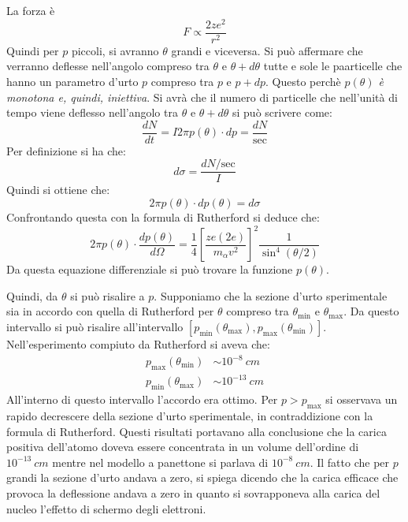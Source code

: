 La forza è
\begin{equation}
F \propto \dfrac{2ze^{2}}{r^{2}}
\end{equation}
Quindi per $p$ piccoli, si avranno $\theta$ grandi e viceversa. Si può affermare
che verranno deflesse nell'angolo compreso tra $\theta$ e $\theta +d\theta$
tutte e sole le paarticelle che hanno un parametro d'urto $p$ compreso tra $p$ e
$p + dp$. Questo perchè \textit{$p(\theta)$ è monotona e, quindi, iniettiva}. Si
avrà che il numero di particelle che nell'unità di tempo viene deflesso
nell'angolo tra $\theta$ e $\theta + d\theta$ si può scrivere come:
\begin{equation}
  \frac{dN}{dt} = I2\pi p(\theta) \cdot dp = \dfrac{dN}{\text{sec}}
\end{equation}
Per definizione si ha che:
\begin{equation}
  d\sigma = \dfrac{dN/\text{sec}}{I}
\end{equation}
Quindi si ottiene che:
\begin{equation}
2\pi p(\theta) \cdot dp(\theta) = d\sigma
\end{equation}
Confrontando questa con la formula di Rutherford si deduce che:
\begin{equation}
2\pi p(\theta) \cdot \dfrac{dp(\theta)}{d\Omega} = \dfrac{1}{4}\left[\dfrac{ze(2e)}{m_{\alpha}v^{2}} \right] ^{2} \dfrac{1}{\sin ^{4} (\theta /2)}
\end{equation}
Da questa equazione differenziale si può trovare la funzione $p(\theta)$.

Quindi, da $\theta$ si può risalire a $p$. Supponiamo che la sezione d'urto
sperimentale sia in accordo con quella di Rutherford per $\theta$ compreso tra
$\theta _\text{min}$ e $\theta _\text{max}$. Da questo intervallo si può
risalire all'intervallo $\left[p_\text{min} (\theta _\text{max}), p_\text{max}
(\theta _\text{min}) \right]$. Nell'esperimento compiuto da Rutherford si aveva
che:
\begin{align}
p_\text{max} (\theta _\text{min}) & \sim 10^{-8} \ cm \\
p_\text{min} (\theta _\text{max}) & \sim 10^{-13} \ cm 
\end{align}
All'interno di questo intervallo l'accordo era ottimo. Per $p > p_\text{max}$ si
osservava un rapido decrescere della sezione d'urto sperimentale, in
contraddizione con la formula di Rutherford. Questi risultati portavano alla
conclusione che la carica positiva dell'atomo doveva essere concentrata in un
volume dell'ordine di $10^{-13}\ cm$ mentre nel modello a panettone si parlava
di $10^{-8} \ cm$. Il fatto che per $p$ grandi la sezione d'urto andava a zero,
si spiega dicendo che la carica efficace che provoca la deflessione andava a
zero in quanto si sovrapponeva alla carica del nucleo l'effetto di schermo degli
elettroni.
